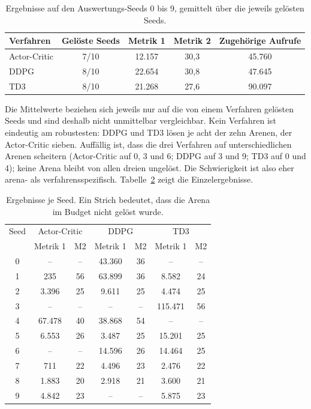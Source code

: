 \documentclass[11pt,a4paper]{article}
\begin{document}
\begin{table}[h]
\centering
\small
\caption{Ergebnisse auf den Auswertungs-Seeds 0 bis 9, gemittelt über die jeweils gelösten Seeds.}
\label{tab:main}
\begin{tabular}{lcccc}
\toprule
Verfahren & Gelöste Seeds & Metrik 1 & Metrik 2 & Zugehörige Aufrufe \\
\midrule
Actor-Critic & 7/10 & 12.157 & 30{,}3 & 45.760 \\
DDPG                 & 8/10 & 22.654 & 30{,}8 & 47.645 \\
TD3                  & 8/10 & 21.268 & 27{,}6 & 90.097 \\
\bottomrule
\end{tabular}
\end{table}

Die Mittelwerte beziehen sich jeweils nur auf die von einem Verfahren gelösten Seeds und sind
deshalb nicht unmittelbar vergleichbar. Kein Verfahren ist eindeutig am robustesten: DDPG und
TD3 lösen je acht der zehn Arenen, der Actor-Critic sieben. Auffällig ist, dass
die drei Verfahren auf unterschiedlichen Arenen scheitern (Actor-Critic auf 0, 3 und 6; DDPG
auf 3 und 9; TD3 auf 0 und 4); keine Arena bleibt von allen dreien ungelöst. Die Schwierigkeit
ist also eher arena- als verfahrensspezifisch. Tabelle~\ref{tab:perseed} zeigt die
Einzelergebnisse.

\begin{table}[h]
\centering
\small
\caption{Ergebnisse je Seed. Ein Strich bedeutet, dass die Arena im Budget nicht gelöst wurde.}
\label{tab:perseed}
\begin{tabular}{ccccccc}
\toprule
Seed & \multicolumn{2}{c}{Actor-Critic} & \multicolumn{2}{c}{DDPG} & \multicolumn{2}{c}{TD3} \\
     & Metrik 1 & M2 & Metrik 1 & M2 & Metrik 1 & M2 \\
\midrule
0 & --     & -- & 43.360 & 36 & --      & -- \\
1 & 235    & 56 & 63.899 & 36 & 8.582   & 24 \\
2 & 3.396  & 25 & 9.611  & 25 & 4.474   & 25 \\
3 & --     & -- & --     & -- & 115.471 & 56 \\
4 & 67.478 & 40 & 38.868 & 54 & --      & -- \\
5 & 6.553  & 26 & 3.487  & 25 & 15.201  & 25 \\
6 & --     & -- & 14.596 & 26 & 14.464  & 25 \\
7 & 711    & 22 & 4.496  & 23 & 2.476   & 22 \\
8 & 1.883  & 20 & 2.918  & 21 & 3.600   & 21 \\
9 & 4.842  & 23 & --     & -- & 5.875   & 23 \\
\bottomrule
\end{tabular}
\end{table}
\end{document}
